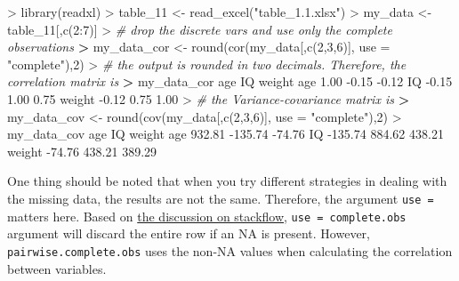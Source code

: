 \documentclass[
]{article}
\newenvironment{Shaded}{\begin{snugshade}}{\end{snugshade}}
\newcommand{\AttributeTok}[1]{\textcolor[rgb]{0.77,0.63,0.00}{#1}}
\newcommand{\CommentTok}[1]{\textcolor[rgb]{0.56,0.35,0.01}{\textit{#1}}}
\newcommand{\DecValTok}[1]{\textcolor[rgb]{0.00,0.00,0.81}{#1}}
\newcommand{\ErrorTok}[1]{\textcolor[rgb]{0.64,0.00,0.00}{\textbf{#1}}}
\newcommand{\FloatTok}[1]{\textcolor[rgb]{0.00,0.00,0.81}{#1}}
\newcommand{\FunctionTok}[1]{\textcolor[rgb]{0.00,0.00,0.00}{#1}}
\newcommand{\NormalTok}[1]{#1}
\newcommand{\OtherTok}[1]{\textcolor[rgb]{0.56,0.35,0.01}{#1}}
\newcommand{\SpecialCharTok}[1]{\textcolor[rgb]{0.00,0.00,0.00}{#1}}
\newcommand{\StringTok}[1]{\textcolor[rgb]{0.31,0.60,0.02}{#1}}
\begin{document}
\begin{Shaded}
\begin{Highlighting}[]
\SpecialCharTok{\textgreater{}} \FunctionTok{library}\NormalTok{(readxl)}
\SpecialCharTok{\textgreater{}}\NormalTok{ table\_11 }\OtherTok{\textless{}{-}} \FunctionTok{read\_excel}\NormalTok{(}\StringTok{"table\_1.1.xlsx"}\NormalTok{)}
\SpecialCharTok{\textgreater{}}\NormalTok{ my\_data }\OtherTok{\textless{}{-}}\NormalTok{ table\_11[,}\FunctionTok{c}\NormalTok{(}\DecValTok{2}\SpecialCharTok{:}\DecValTok{7}\NormalTok{)]}
\SpecialCharTok{\textgreater{}} \CommentTok{\# drop the discrete vars and use only the complete observations}
\ErrorTok{\textgreater{}}\NormalTok{ my\_data\_cor }\OtherTok{\textless{}{-}} \FunctionTok{round}\NormalTok{(}\FunctionTok{cor}\NormalTok{(my\_data[,}\FunctionTok{c}\NormalTok{(}\DecValTok{2}\NormalTok{,}\DecValTok{3}\NormalTok{,}\DecValTok{6}\NormalTok{)], }\AttributeTok{use =} \StringTok{"complete"}\NormalTok{),}\DecValTok{2}\NormalTok{)}
\SpecialCharTok{\textgreater{}} \CommentTok{\# the output is rounded in two decimals. Therefore, the correlation matrix is}
\ErrorTok{\textgreater{}}\NormalTok{ my\_data\_cor}
\NormalTok{         age    IQ weight}
\NormalTok{age     }\FloatTok{1.00} \SpecialCharTok{{-}}\FloatTok{0.15}  \SpecialCharTok{{-}}\FloatTok{0.12}
\NormalTok{IQ     }\SpecialCharTok{{-}}\FloatTok{0.15}  \FloatTok{1.00}   \FloatTok{0.75}
\NormalTok{weight }\SpecialCharTok{{-}}\FloatTok{0.12}  \FloatTok{0.75}   \FloatTok{1.00}
\SpecialCharTok{\textgreater{}} \CommentTok{\# the Variance{-}covariance matrix is }
\ErrorTok{\textgreater{}}\NormalTok{ my\_data\_cov }\OtherTok{\textless{}{-}} \FunctionTok{round}\NormalTok{(}\FunctionTok{cov}\NormalTok{(my\_data[,}\FunctionTok{c}\NormalTok{(}\DecValTok{2}\NormalTok{,}\DecValTok{3}\NormalTok{,}\DecValTok{6}\NormalTok{)], }\AttributeTok{use =} \StringTok{"complete"}\NormalTok{),}\DecValTok{2}\NormalTok{)}
\SpecialCharTok{\textgreater{}}\NormalTok{ my\_data\_cov}
\NormalTok{           age      IQ weight}
\NormalTok{age     }\FloatTok{932.81} \SpecialCharTok{{-}}\FloatTok{135.74} \SpecialCharTok{{-}}\FloatTok{74.76}
\NormalTok{IQ     }\SpecialCharTok{{-}}\FloatTok{135.74}  \FloatTok{884.62} \FloatTok{438.21}
\NormalTok{weight  }\SpecialCharTok{{-}}\FloatTok{74.76}  \FloatTok{438.21} \FloatTok{389.29}
\end{Highlighting}
\end{Shaded}

One thing should be noted that when you try different strategies in
dealing with the missing data, the results are not the same. Therefore,
the argument \texttt{use\ =} matters here. Based on
\href{https://stackoverflow.com/questions/18892051/complete-obs-of-cor-function}{the
discussion on stackflow}, \texttt{use\ =\ complete.obs} argument will
discard the entire row if an NA is present. However,
\texttt{pairwise.complete.obs} uses the non-NA values when calculating
the correlation between variables.
\end{document}
